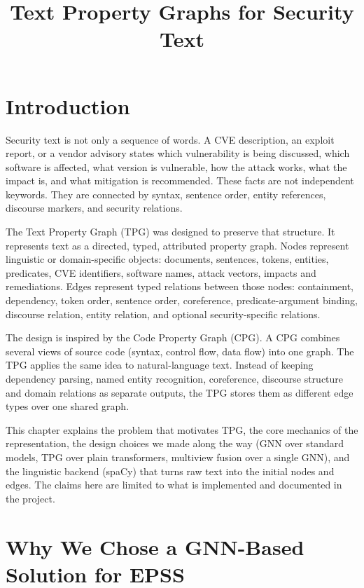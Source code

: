 \documentclass[11pt]{article}
\title{Text Property Graphs for Security Text}
\author{}
\date{}
\begin{document}
\maketitle

\section{Introduction}

Security text is not only a sequence of words. A CVE description, an
exploit report, or a vendor advisory states which vulnerability is being
discussed, which software is affected, what version is vulnerable, how
the attack works, what the impact is, and what mitigation is recommended.
These facts are not independent keywords. They are connected by syntax,
sentence order, entity references, discourse markers, and security
relations.

The Text Property Graph (TPG) was designed to preserve that structure.
It represents text as a directed, typed, attributed property graph.
Nodes represent linguistic or domain-specific objects: documents,
sentences, tokens, entities, predicates, CVE identifiers, software
names, attack vectors, impacts and remediations. Edges represent typed
relations between those nodes: containment, dependency, token order,
sentence order, coreference, predicate-argument binding, discourse
relation, entity relation, and optional security-specific relations.

The design is inspired by the Code Property Graph (CPG). A CPG combines
several views of source code (syntax, control flow, data flow) into one
graph. The TPG applies the same idea to natural-language text. Instead
of keeping dependency parsing, named entity recognition, coreference,
discourse structure and domain relations as separate outputs, the TPG
stores them as different edge types over one shared graph.

This chapter explains the problem that motivates TPG, the core
mechanics of the representation, the design choices we made along the
way (GNN over standard models, TPG over plain transformers, multiview
fusion over a single GNN), and the linguistic backend (spaCy) that
turns raw text into the initial nodes and edges. The claims here are
limited to what is implemented and documented in the project.

\section{Why We Chose a GNN-Based Solution for EPSS}
\end{document}
